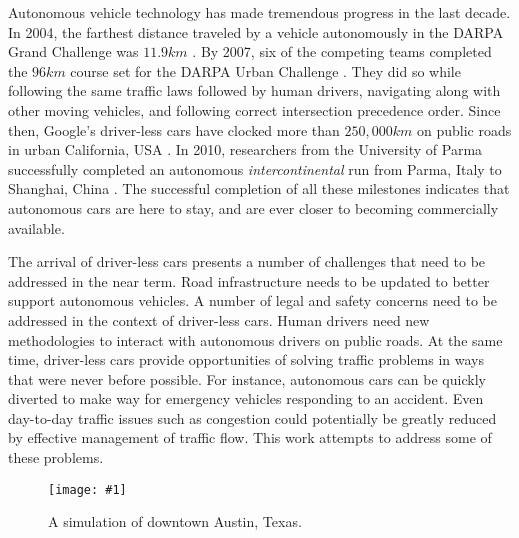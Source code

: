 \documentclass[letterpaper, 10 pt, conference]{ieeeconf}  %
\newcommand{\pix}[3]{
  \begin{figure}[h]
    \centering \texttt{[image: \#1]}
    \caption{#2}
  \end{figure}
}
\begin{document}

Autonomous vehicle technology has made tremendous progress in the last decade. In 2004, the farthest distance traveled by a vehicle autonomously in the DARPA Grand Challenge was $11.9km$ \cite{cnnGrandChallenge2004}. By 2007, six of the competing teams completed the $96km$ course set for the DARPA Urban Challenge \cite{spectrumUrbanChallenge2007}. They did so while following the same traffic laws followed by human drivers, navigating along with other moving vehicles, and following correct intersection precedence order. Since then, Google's driver-less cars have clocked more than $250,000km$ on public roads in urban California, USA \cite{tedThrun2011}. In 2010, researchers from the University of Parma successfully completed an autonomous \textit{intercontinental} run from Parma, Italy to Shanghai, China \cite{cnnVislab2010}. The successful completion of all these milestones indicates that autonomous cars are here to stay, and are ever closer to becoming commercially available. 

The arrival of driver-less cars presents a number of challenges that need to be addressed in the near term. Road infrastructure needs to be updated to better support autonomous vehicles. A number of legal and safety concerns need to be addressed in the context of driver-less cars. Human drivers need new methodologies to interact with autonomous drivers on public roads. At the same time, driver-less cars provide opportunities of solving traffic problems in ways that were never before possible. For instance, autonomous cars can be quickly diverted to make way for emergency vehicles responding to an accident. Even day-to-day traffic issues such as congestion could potentially be greatly reduced by effective management of traffic flow. This work attempts to address some of these problems.




\pix{downtown_atx.png}{A simulation of downtown Austin, Texas.}{scale=0.25}
\end{document}
